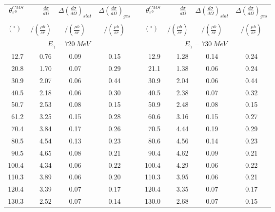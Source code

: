 \begin{table}[htbp] 
\begin{center} 
\begin{tabular}{|r|r|c|c|l|r|r|c|c|} 

\cline{1-4}
\cline{6-9} 
$\theta_{\pi^0}^{CMS}$ & 
$\displaystyle\frac{d\sigma}{d\Omega}\;$ & 
${\Delta}\left( \frac{d\sigma}{d\Omega}\right)_{stat}$ & 
${\Delta}\left( \frac{d\sigma}{d\Omega}\right)_{ges}$ & & 
$\theta_{\pi^0}^{CMS}$ & 
$\displaystyle\frac{d\sigma}{d\Omega}\;$ & 
${\Delta}\left( \frac{d\sigma}{d\Omega}\right)_{stat}$ & 
${\Delta}\left( \frac{d\sigma}{d\Omega}\right)_{ges}$ \\ 
& & & & & & & &\\ 
 $(^{\circ})\;$ & $/(\frac{{\mu}b}{sr})$ & $/(\frac{{\mu}b}{sr})$ & $/(\frac{{\mu}b}{sr})$ & & $(^{\circ})\;$ & $/(\frac{{\mu}b}{sr})$ & $/(\frac{{\mu}b}{sr})$ & $/(\frac{{\mu}b}{sr})$ \\ 
\cline{1-4} 
\cline{6-9} 
\multicolumn{4}{|c|}{ $E_{\gamma}=720~MeV$} & & 
\multicolumn{4}{c|}{ $E_{\gamma}=730~MeV$} \\ 
\cline{1-4} 
\cline{6-9} 
 12.7 &  0.76 &  0.09 &  0.15 & &  12.9 &  1.28 &  0.14 &  0.24 \\ 
 20.8 &  1.70 &  0.07 &  0.29 & &  21.1 &  1.38 &  0.06 &  0.24 \\ 
 30.9 &  2.07 &  0.06 &  0.44 & &  30.9 &  2.04 &  0.06 &  0.44 \\ 
 40.5 &  2.18 &  0.06 &  0.30 & &  40.5 &  2.38 &  0.07 &  0.32 \\ 
 50.7 &  2.53 &  0.08 &  0.15 & &  50.9 &  2.48 &  0.08 &  0.15 \\ 
 61.2 &  3.25 &  0.15 &  0.28 & &  60.6 &  3.16 &  0.15 &  0.27 \\ 
 70.4 &  3.84 &  0.17 &  0.26 & &  70.5 &  4.44 &  0.19 &  0.29 \\ 
 80.5 &  4.54 &  0.13 &  0.23 & &  80.6 &  4.56 &  0.14 &  0.23 \\ 
 90.5 &  4.65 &  0.08 &  0.21 & &  90.4 &  4.62 &  0.09 &  0.21 \\ 
100.4 &  4.34 &  0.06 &  0.22 & & 100.4 &  4.29 &  0.06 &  0.22 \\ 
110.3 &  3.89 &  0.06 &  0.20 & & 110.3 &  3.95 &  0.06 &  0.21 \\ 
120.4 &  3.39 &  0.07 &  0.17 & & 120.4 &  3.35 &  0.07 &  0.17 \\ 
130.3 &  2.52 &  0.07 &  0.14 & & 130.0 &  2.68 &  0.07 &  0.15 \\ 

\end{tabular}
\end{center}
\end{table}
